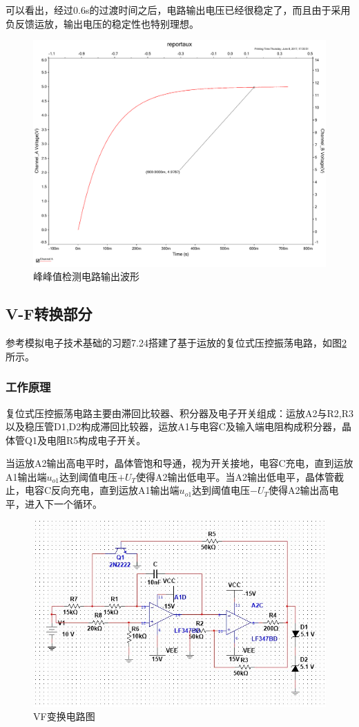 \documentclass[UTF8,a4paper]{paper}
\begin{document}
可以看出，经过0.6s的过渡时间之后，电路输出电压已经很稳定了，而且由于采用负反馈运放，输出电压的稳定性也特别理想。
\begin{figure}[h]
\centering
\includegraphics[width=\textwidth]{f4.pdf}
\caption{峰峰值检测电路输出波形}
\label{f4}
\end{figure}

\subsection{V-F转换部分}
参考模拟电子技术基础的习题7.24搭建了基于运放的复位式压控振荡电路，如图\ref{f5}所示。

\subsubsection{工作原理}
复位式压控振荡电路主要由滞回比较器、积分器及电子开关组成：运放A2与R2,R3以及稳压管D1,D2构成滞回比较器，运放A1与电容C及输入端电阻构成积分器，晶体管Q1及电阻R5构成电子开关。

当运放A2输出高电平时，晶体管饱和导通，视为开关接地，电容C充电，直到运放A1输出端$u_{o1}$达到阈值电压$+U_T$使得A2输出低电平。当A2输出低电平，晶体管截止，电容C反向充电，直到运放A1输出端$u_{o1}$达到阈值电压$-U_T$使得A2输出高电平，进入下一个循环。
\begin{figure}[h]
\centering
\includegraphics[width=\textwidth]{f5.jpg}
\caption{VF变换电路图}
\label{f5}
\end{figure}
\end{document}
